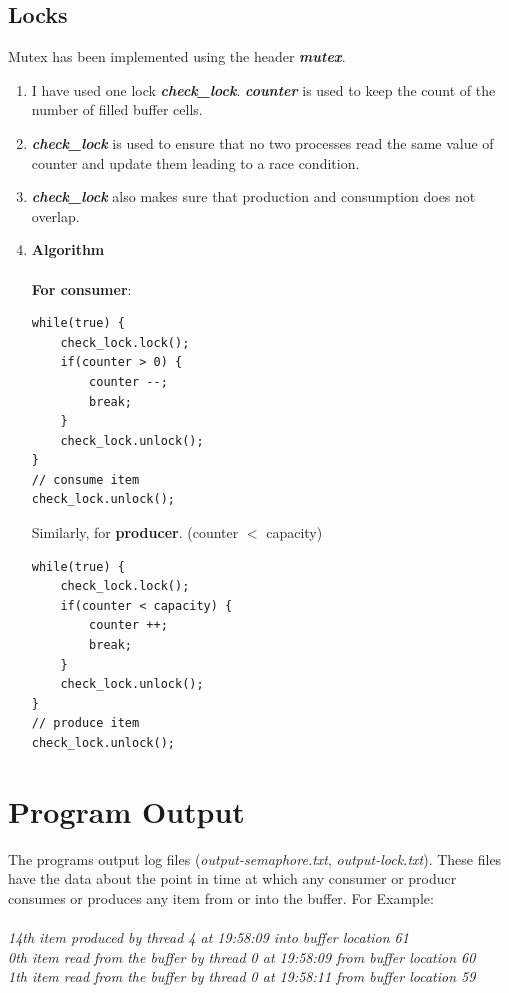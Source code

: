 \documentclass[a4paper,12pt]{report}
\begin{document}
\subsection{Locks}
Mutex has been implemented using the header \textit{\textbf{mutex}}.
\begin{enumerate}
\item I have used one lock \textbf{\textit{check\_lock}}. \textbf{\textit{counter}} is used to keep the count of the number of filled buffer cells.
\item \textbf{\textit{check\_lock}} is used to ensure that no two processes read the same value of counter and update them leading to a race condition.
\item \textbf{\textit{check\_lock}} also makes sure that production and consumption does not overlap.
\item \textbf{Algorithm}\\\\
\textbf{For consumer}:
\begin{lstlisting}
while(true) {
	check_lock.lock();
	if(counter > 0) {
		counter --;
		break;
	}
	check_lock.unlock();
}
// consume item
check_lock.unlock();
\end{lstlisting}
Similarly, for \textbf{producer}. (counter $<$ capacity)
\begin{lstlisting}
while(true) {
	check_lock.lock();
	if(counter < capacity) {
		counter ++;
		break;
	} 
	check_lock.unlock();
}
// produce item
check_lock.unlock();
\end{lstlisting}
\end{enumerate}
\newpage
\section{Program Output}
The programs output log files (\textit{output-semaphore.txt}, \textit{output-lock.txt}). These files have the data about the point in time at which any consumer or producr consumes or produces any item from or into the buffer.
For Example:\\\\
\textit{14th item produced by thread 4 at 19:58:09 into buffer location 61\\
0th item read from the buffer by thread 0 at 19:58:09 from buffer location 60\\
1th item read from the buffer by thread 0 at 19:58:11 from buffer location 59}
\newpage
\end{document}
